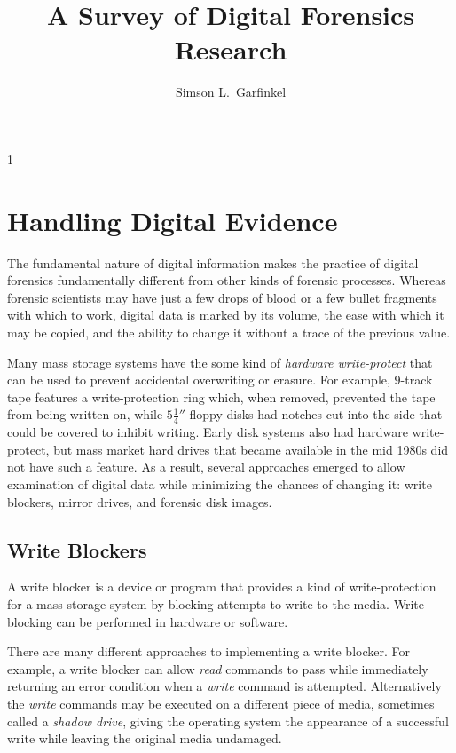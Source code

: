 \documentclass[11pt,letter]{article}
\begin{document}
\title{A Survey of Digital Forensics Research}
\author{Simson L.\ Garfinkel}
\maketitle
{}

      1

\chapter{Handling Digital Evidence}
The fundamental nature of digital information makes the practice of
digital forensics fundamentally different from other kinds of forensic
processes.  Whereas forensic scientists may have just a few drops of
blood or a few bullet fragments with which to work, digital data is
marked by its volume, the ease with which it may be copied, and the
ability to change it without a trace of the previous value.

Many mass storage systems have the some kind of \emph{hardware
  write-protect} that can be used to prevent accidental overwriting or
erasure. For example, 9-track tape features a
write-protection ring which, when removed, prevented the tape from
being written on, while $5\frac{1}{4}''$ floppy disks had notches cut into
the side that could be covered to inhibit writing. Early disk systems
also had hardware write-protect, but mass market hard drives that
became available in the mid 1980s did not have such a feature. As a
result, several approaches emerged to allow examination of digital
data while minimizing the chances of changing it: write
blockers, mirror drives, and forensic disk images.

\section{Write Blockers}

A write blocker is a device or program that provides a kind of
write-protection for a mass storage system by blocking attempts to
write to the media. Write blocking can be performed in hardware or
software. 

There are many different approaches to implementing a write
blocker. For example, a write blocker can allow \emph{read} commands
to pass while immediately returning an error condition when a
\emph{write} command is attempted. Alternatively the \emph{write}
commands may be executed on a different piece of media, sometimes
called a \emph{shadow drive}, giving the operating system the
appearance of a successful write while leaving the original media
undamaged.
\end{document}
